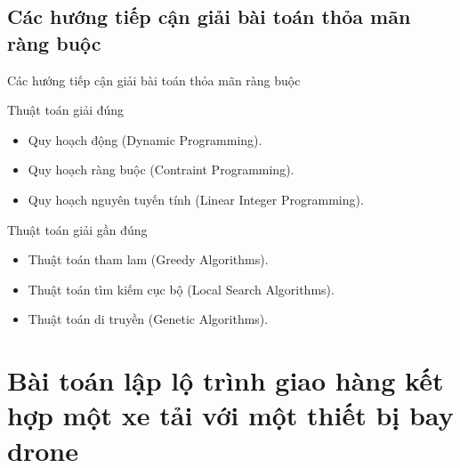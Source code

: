 \documentclass[compress]{beamer}
\begin{document}
\subsection{Các hướng tiếp cận giải bài toán thỏa mãn ràng buộc}
\begin{frame}{Các hướng tiếp cận giải bài toán thỏa mãn ràng buộc}
\begin{block}{Thuật toán giải đúng}

\begin{itemize}
\item Quy hoạch động (Dynamic Programming).
\item Quy hoạch ràng buộc (Contraint Programming).
\item Quy hoạch nguyên tuyến tính (Linear Integer Programming).
\end{itemize}

\end{block}
\begin{block}{Thuật toán giải gần đúng}
\begin{itemize}
\item Thuật toán tham lam (Greedy Algorithms).
\item Thuật toán tìm kiếm cục bộ (Local Search Algorithms).
\item Thuật toán di truyền (Genetic Algorithms).
\end{itemize}

\end{block}
\end{frame}
\section{Bài toán lập lộ trình giao hàng kết hợp một xe tải với một thiết bị bay drone}
\end{document}
